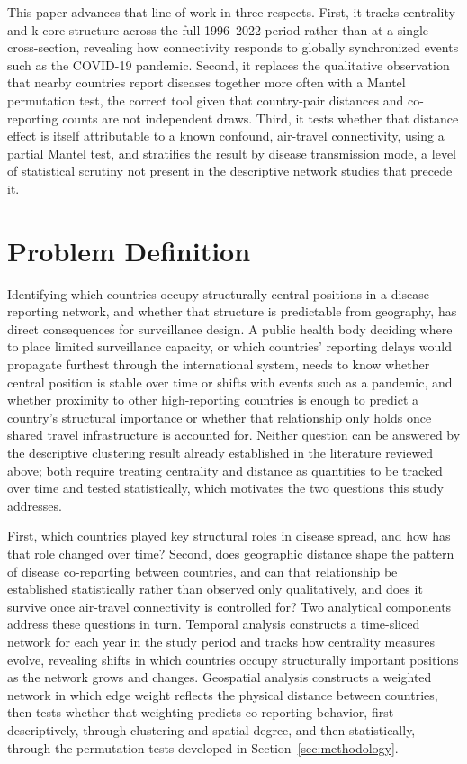 \documentclass[11pt]{article}
\begin{document}
This paper advances that line of work in three respects. First, it tracks centrality and
k-core structure across the full 1996--2022 period rather than at a single cross-section,
revealing how connectivity responds to globally synchronized events such as the COVID-19
pandemic. Second, it replaces the qualitative observation that nearby countries report
diseases together more often with a Mantel permutation test, the correct tool given that
country-pair distances and co-reporting counts are not independent draws. Third, it tests
whether that distance effect is itself attributable to a known confound, air-travel
connectivity, using a partial Mantel test, and stratifies the result by disease transmission
mode, a level of statistical scrutiny not present in the descriptive network studies that
precede it.

\section{Problem Definition}

Identifying which countries occupy structurally central positions in a disease-reporting
network, and whether that structure is predictable from geography, has direct
consequences for surveillance design. A public health body deciding where to place
limited surveillance capacity, or which countries' reporting delays would propagate
furthest through the international system, needs to know whether central position is
stable over time or shifts with events such as a pandemic, and whether proximity to other
high-reporting countries is enough to predict a country's structural importance or
whether that relationship only holds once shared travel infrastructure is accounted for.
Neither question can be answered by the descriptive clustering result already
established in the literature reviewed above; both require treating centrality and
distance as quantities to be tracked over time and tested statistically, which motivates
the two questions this study addresses.

First, which countries played key structural roles in disease spread, and how has that
role changed over time? Second, does geographic distance shape the pattern of disease
co-reporting between countries, and can that relationship be established statistically
rather than observed only qualitatively, and does it survive once air-travel connectivity
is controlled for? Two analytical components address these questions in turn. Temporal
analysis constructs a time-sliced network for each year in the study period and tracks
how centrality measures evolve, revealing shifts in which countries occupy structurally
important positions as the network grows and changes. Geospatial analysis constructs a
weighted network in which edge weight reflects the physical distance between countries,
then tests whether that weighting predicts co-reporting behavior, first descriptively,
through clustering and spatial degree, and then statistically, through the permutation
tests developed in Section~\ref{sec:methodology}.
\end{document}
